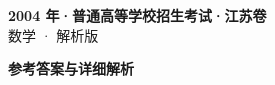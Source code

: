 \documentclass[zihao=-4, a4paper]{ctexart}
\begin{document}
\begin{center}
  {\Large\bfseries 2004 年·普通高等学校招生考试·江苏卷}\\[4pt]
  {\large 数学 · 解析版}
\end{center}
\medskip
{}

\clearpage
{}
\begin{center}{\Large\bfseries 参考答案与详细解析}\end{center}
\medskip

\end{document}
